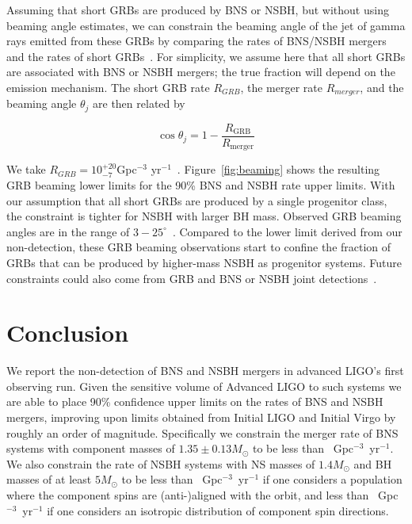 \documentclass[twocolumn]{aastex6}
\begin{document}
Assuming that short \acp{GRB} are produced by \ac{BNS} or \ac{NSBH}, but
without using beaming angle estimates, we can constrain the beaming angle of the jet
of gamma rays emitted from these \acp{GRB} by comparing the rates of
\ac{BNS}/\ac{NSBH} mergers and the rates of
short \acp{GRB}~\citep{Chen:2012qh}. 
For simplicity, we assume here that all short \acp{GRB} are associated with \ac{BNS}
or \ac{NSBH} mergers; the true fraction will
depend on the emission mechanism.  The short \ac{GRB} rate $R_{GRB}$, the merger rate
$R_{merger}$, and the beaming angle $\theta_j$ are then related by 
%
\begin{linenomath*}
\begin{equation}\label{eq:beaming}
\cos \theta_j = 1 - \frac{R_{\mathrm{GRB}}}{R_{\mathrm{merger}}}
\end{equation}
\end{linenomath*}
%
We take $R_{GRB}=10^{+20}_{-7}$Gpc$^{-3}$
yr$^{-1}$~\citep{Coward:2012gn,Nakar:2005bs}. 
Figure~\ref{fig:beaming} shows the resulting \ac{GRB} beaming lower limits for the
90\% \ac{BNS} and \ac{NSBH} rate upper limits. 
With our assumption that all short \ac{GRB}s are produced by a single progenitor
class, the constraint is tighter for \ac{NSBH} with larger
\ac{BH} mass.
Observed \ac{GRB} beaming angles are in the range of
$3-25^{\circ}$~\citep{Fox:2005kv,Fong:2015oha,Grupe:2006uc,Soderberg:2006bn,2013ApJ...766...41S,2012ApJ...756...63M,2011A&A...531L...6N}. 
Compared to the lower limit derived from our non-detection, these \ac{GRB}
beaming observations start to confine the fraction of \ac{GRB}s that can be
produced by higher-mass NSBH as progenitor systems.
Future constraints could also come from \ac{GRB} and \ac{BNS} or \ac{NSBH} joint
detections~\citep{Dietz:2010eh,Regimbau:2014nxa, Clark:2014jpa}. 

\section{Conclusion}
\label{sec:conclusion}

We report the non-detection of \ac{BNS} and \ac{NSBH} mergers in advanced \ac{LIGO}'s first observing run.
Given the sensitive volume of Advanced \ac{LIGO} to such systems we are able to place 90\%
confidence upper limits on the rates of \ac{BNS} and \ac{NSBH} mergers, improving upon limits
obtained from Initial \ac{LIGO} and Initial Virgo by roughly an order of magnitude.
Specifically we constrain the merger rate of \ac{BNS} systems with component masses of $1.35\pm0.13M_{\odot}$ 
to be less than \MainBNSULPyCBCHighSpin~Gpc$^{-3}$~yr$^{-1}$. We also constrain
the rate of \ac{NSBH} systems with NS masses of $1.4M_\odot$ and BH masses of at least $5M_{\odot}$ to be less than \MainNSBHULPyCBCFiveAligned~Gpc$^{-3}$~yr$^{-1}$ if
one considers a population where the component spins are (anti-)aligned with
the orbit, and less than \MainNSBHULPyCBCFiveIso~Gpc$^{-3}$~yr$^{-1}$ if one considers an isotropic distribution
of component spin directions.
\end{document}
